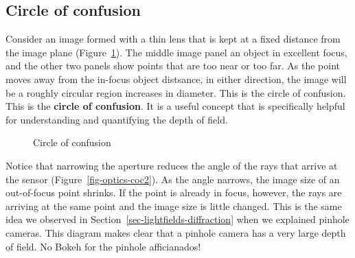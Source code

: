 \documentclass[
  letterpaper,
]{book}
\begin{document}
\subsection{Circle of confusion}\label{sec-optics-coc}

Consider an image formed with a thin lens that is kept at a fixed
distance from the image plane (Figure~\ref{fig-optics-coc1}). The middle
image panel an object in excellent focus, and the other two panels show
points that are too near or too far. As the point moves away from the
in-focus object distsance, in either direction, the image will be a
roughly circular region increases in diameter. This is the circle of
confusion. This is the \textbf{circle of confusion}. It is a useful
concept that is specifically helpful for understanding and quantifying
the depth of field.

\begin{figure}


\caption{\label{fig-optics-coc1}Circle of confusion}

\end{figure}%

Notice that narrowing the aperture reduces the angle of the rays that
arrive at the sensor (Figure~\ref{fig-optics-coc2}). As the angle
narrows, the image size of an out-of-focus point shrinks. If the point
is already in focus, however, the rays are arriving at the same point
and the image size is little changed. This is the same idea we observed
in Section~\ref{sec-lightfields-diffraction} when we explained pinhole
cameras. This diagram makes clear that a pinhole camera has a very large
depth of field. No Bokeh for the pinhole afficianados!
\end{document}

